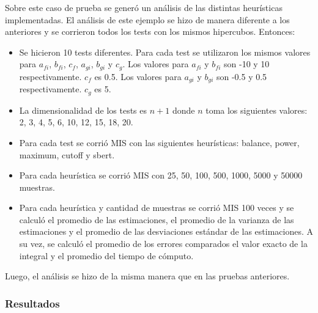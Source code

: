 \documentclass{article}
\begin{document}
Sobre este caso de prueba se generó un análisis de las distintas heurísticas implementadas.
El análisis de este ejemplo se hizo de manera diferente a los anteriores y se corrieron todos los tests con los mismos hipercubos.
Entonces:
\begin{itemize}
\item Se hicieron 10 tests diferentes. Para cada test se utilizaron los mismos valores para \( a_{fi} \), \( b_{fi} \), \( c_f \), \( a_{gi} \), \( b_{gi} \) y \( c_g \).
      Los valores para \( a_{fi} \) y \( b_{fi} \) son -10 y 10 respectivamente. \( c_f \) es 0.5.
      Los valores para \( a_{gi} \) y \( b_{gi} \) son -0.5 y 0.5 respectivamente. \( c_g \) es 5.
\item La dimensionalidad de los tests es \( n + 1 \) donde \( n \) toma los siguientes valores: 2, 3, 4, 5, 6, 10, 12, 15, 18, 20.
\item Para cada test se corrió MIS con las siguientes heurísticas: balance, power, maximum, cutoff y sbert.
\item Para cada heurística se corrió MIS con 25, 50, 100, 500, 1000, 5000 y 50000 muestras.
\item Para cada heurística y cantidad de muestras se corrió MIS 100 veces y se calculó el promedio de las estimaciones,
      el promedio de la varianza de las estimaciones y el promedio de las desviaciones estándar de las estimaciones.
      A su vez, se calculó el promedio de los errores comparados el valor exacto de la integral y el promedio del tiempo de cómputo.
\end{itemize}

Luego, el análisis se hizo de la misma manera que en las pruebas anteriores.

\subsubsection{Resultados}
\end{document}
